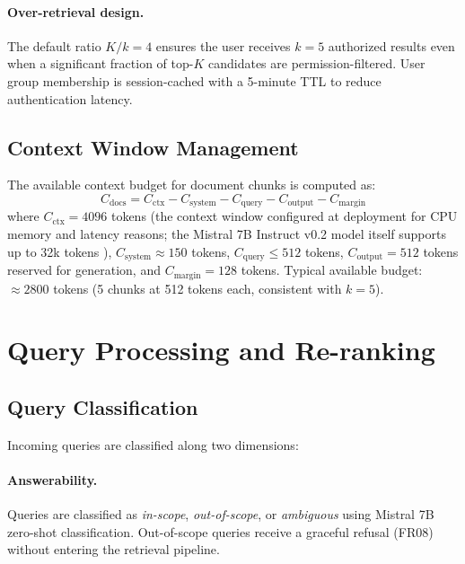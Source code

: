 \paragraph{Over-retrieval design.} The default ratio $K/k = 4$ ensures the user receives $k = 5$ authorized results even when a significant fraction of top-$K$ candidates are permission-filtered. User group membership is session-cached with a 5-minute TTL to reduce authentication latency.

\subsection{Context Window Management}

The available context budget for document chunks is computed as:
\begin{equation}
  C_{\text{docs}} = C_{\text{ctx}} - C_{\text{system}} - C_{\text{query}} - C_{\text{output}} - C_{\text{margin}}
  \label{eq:context-budget}
\end{equation}
where $C_{\text{ctx}} = 4096$ tokens (the context window configured at deployment for CPU memory and latency reasons; the Mistral 7B Instruct v0.2 model itself supports up to 32k tokens \citep{MistralAI2023V02}), $C_{\text{system}} \approx 150$ tokens, $C_{\text{query}} \leq 512$ tokens, $C_{\text{output}} = 512$ tokens reserved for generation, and $C_{\text{margin}} = 128$ tokens. Typical available budget: $\approx 2800$ tokens (5 chunks at 512 tokens each, consistent with $k = 5$).

\section{Query Processing and Re-ranking}
\label{sec:arch-query}

\subsection{Query Classification}

Incoming queries are classified along two dimensions:

\paragraph{Answerability.} Queries are classified as \textit{in-scope}, \textit{out-of-scope}, or \textit{ambiguous} using Mistral 7B zero-shot classification. Out-of-scope queries receive a graceful refusal (FR08) without entering the retrieval pipeline.


